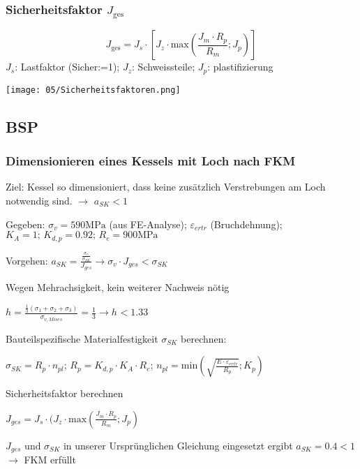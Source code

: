         \subsubsection{Sicherheitsfaktor $J_{\textrm{ges}}$}
        \small\[J_{\textrm{ges}}= J_s \cdot \left[ J_z \cdot \textrm{max}\left(\frac{J_m \cdot R_p}{R_m}; J_p \right) \right] \]\normalsize
        $J_s$: Lastfaktor (Sicher:=1); $J_z$: Schweissteile; $J_p$: plastifizierung
        \begin{center}
            \texttt{[image: 05/Sicherheitsfaktoren.png]}
        \end{center}
    
    \subsection{BSP}
        \subsubsection{Dimensionieren eines Kessels mit Loch nach FKM}
        Ziel: Kessel so dimensioniert, dass keine zusätzlich Verstrebungen am Loch notwendig sind. $\rightarrow$  $ a_{SK}<1 $
        
        Gegeben: $ \sigma_v = 590 \textrm{MPa} $ (aus FE-Analyse); $ \varepsilon_{ertr} $ (Bruchdehnung); $K_A = 1 \textrm{; } K_{d,p} = 0.92 \textrm{; } R_e = 900 \textrm{MPa} $
        
        Vorgehen:
        $ a_{{SK}} = \frac{\frac{\sigma_v}{\sigma_{{SK}}}}{J_{ges}}  \rightarrow  \sigma_v \cdot J_{ges} < \sigma_{{SK}} $
        
        Wegen Mehrachsigkeit, kein weiterer Nachweis nötig
        
        $ h = \frac{\frac{1}{3}(\sigma_1+\sigma_2+\sigma_3)}{\sigma_{{v,Mises}}}=\frac{1}{3} 
        \rightarrow  h_{} < 1.33_{} $
        
        Bauteilspezifische Materialfestigkeit $ \sigma_{SK} $ berechnen:
        
        $ \sigma_{SK} = R_p \cdot n_{pl} $;
        $ R_p = K_{d,p} \cdot K_A \cdot R_e $; %
        $ n_{pl} = \textrm{min}(\sqrt{\frac{E \cdot \varepsilon_{ertr}}{R_p}}; K_p) $
        
        Sicherheitsfaktor berechnen
        
        $ J_{ges} = J_s \cdot ( J_z \cdot \textrm{max}(\frac{J_m \cdot R_p}{R_m} ; J_p) $
        
        $ {J_{ges}} \textrm{ und } \sigma_{SK}$ in unserer Ursprünglichen Gleichung eingesetzt ergibt ${a_{SK} = 0.4 < 1} $ $\rightarrow$ FKM erfüllt
